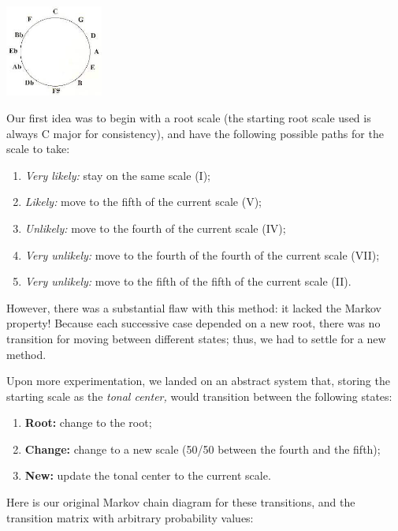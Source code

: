 \documentclass{article}
\begin{document}
\begin{center}
    \includegraphics[height=3cm]{circleoffifths}
\end{center}

Our first idea was to begin with a root scale (the starting root scale used is always C major for consistency), and have the following possible paths for the scale to take:

\begin{enumerate}[label=]
    \setlength\itemsep{-1em}
    \item \textit{Very likely:} stay on the same scale (I);
    \item \textit{Likely:} move to the fifth of the current scale (V);
    \item \textit{Unlikely:} move to the fourth of the current scale (IV);
    \item \textit{Very unlikely:} move to the fourth of the fourth of the current scale (VII);
    \item \textit{Very unlikely:} move to the fifth of the fifth of the current scale (II).
\end{enumerate}

However, there was a substantial flaw with this method: it lacked the Markov property! Because each successive case depended on a new root, there was no transition for moving between different states; thus, we had to settle for a new method.

Upon more experimentation, we landed on an abstract system that, storing the starting scale as the \textit{tonal center,} would transition between the following states: 

\begin{enumerate}[label=]
    \setlength\itemsep{-1em}
    \item \textbf{Root:} change to the root;
    \item \textbf{Change:} change to a new scale (50/50 between the fourth and the fifth);
    \item \textbf{New:} update the tonal center to the current scale.
\end{enumerate}

Here is our original Markov chain diagram for these transitions, and the transition matrix with arbitrary probability values:
\end{document}
